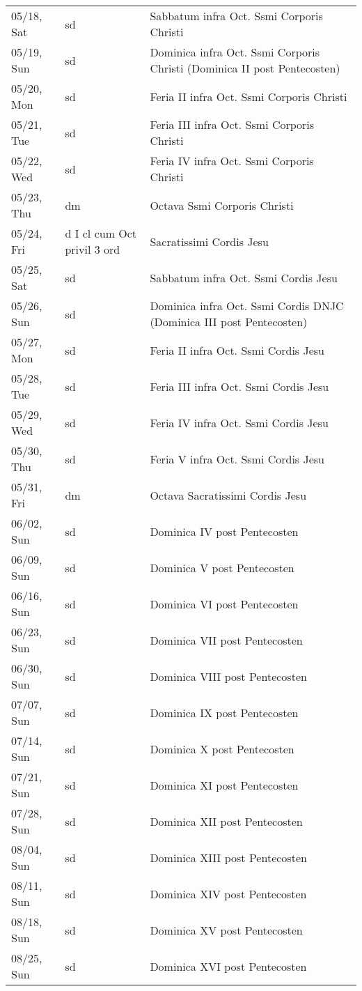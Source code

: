 \documentclass{article}
\begin{document}
\begin{longtable}{ l l l }
05/18, Sat & sd & Sabbatum infra Oct. Ssmi Corporis Christi\\
05/19, Sun & sd & Dominica infra Oct. Ssmi Corporis Christi (Dominica II post Pentecosten)\\
05/20, Mon & sd & Feria II infra Oct. Ssmi Corporis Christi\\
05/21, Tue & sd & Feria III infra Oct. Ssmi Corporis Christi\\
05/22, Wed & sd & Feria IV infra Oct. Ssmi Corporis Christi\\
05/23, Thu & dm & Octava Ssmi Corporis Christi\\
05/24, Fri & d I cl cum Oct privil 3 ord & Sacratissimi Cordis Jesu\\
05/25, Sat & sd & Sabbatum infra Oct. Ssmi Cordis Jesu\\
05/26, Sun & sd & Dominica infra Oct. Ssmi Cordis DNJC (Dominica III post Pentecosten)\\
05/27, Mon & sd & Feria II infra Oct. Ssmi Cordis Jesu\\
05/28, Tue & sd & Feria III infra Oct. Ssmi Cordis Jesu\\
05/29, Wed & sd & Feria IV infra Oct. Ssmi Cordis Jesu\\
05/30, Thu & sd & Feria V infra Oct. Ssmi Cordis Jesu\\
05/31, Fri & dm & Octava Sacratissimi Cordis Jesu\\
06/02, Sun & sd & Dominica IV post Pentecosten\\
06/09, Sun & sd & Dominica V post Pentecosten\\
06/16, Sun & sd & Dominica VI post Pentecosten\\
06/23, Sun & sd & Dominica VII post Pentecosten\\
06/30, Sun & sd & Dominica VIII post Pentecosten\\
07/07, Sun & sd & Dominica IX post Pentecosten\\
07/14, Sun & sd & Dominica X post Pentecosten\\
07/21, Sun & sd & Dominica XI post Pentecosten\\
07/28, Sun & sd & Dominica XII post Pentecosten\\
08/04, Sun & sd & Dominica XIII post Pentecosten\\
08/11, Sun & sd & Dominica XIV post Pentecosten\\
08/18, Sun & sd & Dominica XV post Pentecosten\\
08/25, Sun & sd & Dominica XVI post Pentecosten\\

\end{longtable}
\end{document}
